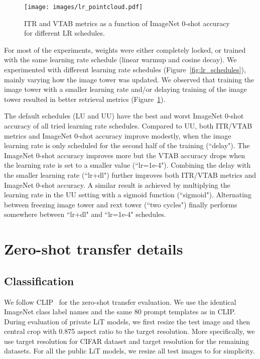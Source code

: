 \documentclass[10pt,twocolumn,letterpaper]{article}
\begin{document}
\begin{figure}[t]
    \centering
    \texttt{[image: images/lr\_pointcloud.pdf]}
    \caption{ITR and VTAB metrics as a function of ImageNet 0-shot accuracy for different LR schedules.}
    \label{fig:lr_pointcloud}
\end{figure}

For most of the experiments, weights were either completely locked, or trained with the same learning rate schedule (linear warmup and cosine decay). We experimented with different learning rate schedules (Figure~\ref{fig:lr_schedules}), mainly varying how the image tower was updated. We observed that training the image tower with a smaller learning rate and/or delaying training of the image tower resulted in better retrieval metrics (Figure~\ref{fig:lr_pointcloud}).

The default schedules (LU and UU) have the best and worst ImageNet 0-shot accuracy of all tried learning rate schedules. Compared to UU, both ITR/VTAB metrics and ImageNet 0-shot accuracy improve modestly, when the image learning rate is only scheduled for the second half of the training (“delay"). The ImageNet 0-shot accuracy improves more but the VTAB accuracy drops when the learning rate is set to a smaller value (“lr=1e-4"). Combining the delay with the smaller learning rate (“lr+dl") further improves both ITR/VTAB metrics and ImageNet 0-shot accuracy. A similar result is achieved by multiplying the learning rate in the UU setting with a sigmoid function (“sigmoid"). Alternating between freezing image tower and rext tower (“two cycles") finally performs somewhere between “lr+dl" and “lr=1e-4" schedules.

\section{Zero-shot transfer details}
\label{appendix:zero-shot-details}
\subsection{Classification}

We follow CLIP~\cite{clip} for the zero-shot transfer evaluation. We use the identical ImageNet class label names and the same 80 prompt templates as in CLIP.
During evaluation of private LiT models, we first resize the test image and then central crop with 0.875 aspect ratio to the target resolution. More specifically, we use  target resolution for CIFAR dataset and  target resolution for the remaining datasets.
For all the public LiT models, we resize all test images to  for simplicity.
\end{document}
